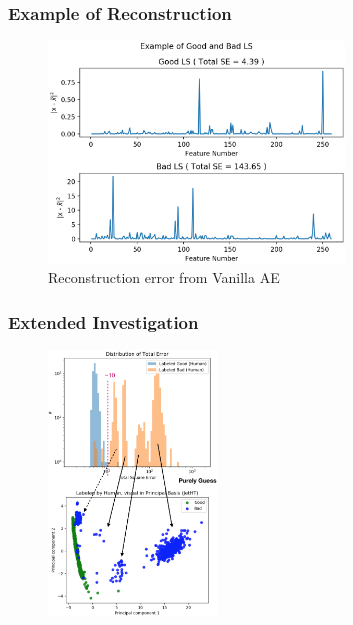 \documentclass{beamer}
\begin{document}
\begin{frame}
\frametitle{Example of Reconstruction}
\begin{figure}
    \includegraphics[height=0.7\textheight, width=0.7\textwidth]{images/example_se}
    \caption{Reconstruction error from Vanilla AE}
\end{figure}
\end{frame}

\begin{frame}
\frametitle{Extended Investigation}
\begin{figure}
    \includegraphics[height=0.85\textheight, width=0.4\textwidth]{images/guess}
\end{figure}
\end{frame}
\end{document}
